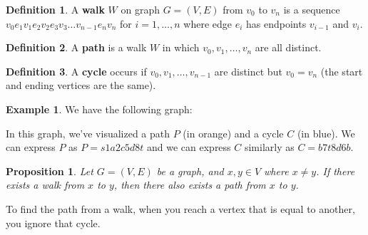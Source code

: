 \documentclass[]{article}
\newtheorem*{proposition}{Proposition}
\theoremstyle{definition}
\newtheorem*{defn}{Definition}
\newtheorem{ex}{Example}[section]
\begin{document}
			\begin{defn}
				A \textbf{walk} $W$ on graph $G = (V, E)$ from $v_0$ to $v_n$ is a sequence $v_0 e_1 v_1 e_2 v_2 e_3 v_3 \ldots v_{n - 1} e_n v_n$ for $i = 1, \ldots, n$ where edge $e_i$ has endpoints $v_{i - 1}$ and $v_i$.
			\end{defn}

			\begin{defn}
				A \textbf{path} is a walk $W$ in which $v_0, v_1, \ldots, v_n$ are all distinct.
			\end{defn}

			\begin{defn}
				A \textbf{cycle} occurs if $v_0, v_1, \ldots, v_{n - 1}$ are distinct but $v_0 = v_n$ (the start and ending vertices are the same).
			\end{defn}

			\begin{ex}
				We have the following graph:
				\begin{center}
				\end{center}
				
				In this graph, we've visualized a path $P$ (in orange) and a cycle $C$ (in blue). We can express $P$ as $P = s1a2c5d8t$ and we can express $C$ similarly as $C = b7t8d6b$.
			\end{ex}
			
			\begin{proposition}
				Let $G = (V, E)$ be a graph, and $x, y \in V$ where $x \ne y$. If there exists a walk from $x$ to $y$, then there also exists a path from $x$ to $y$.
			\end{proposition}
			
			To find the path from a walk, when you reach a vertex that is equal to another, you ignore that cycle.
\end{document}
